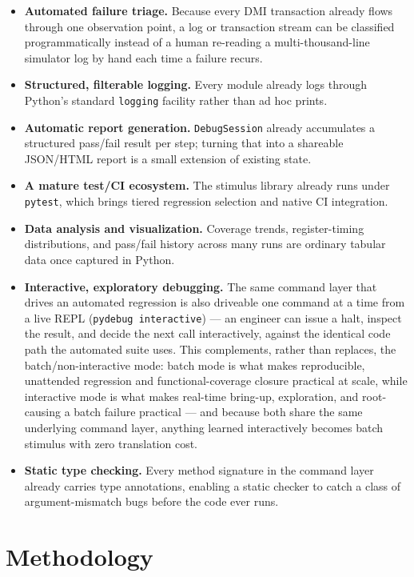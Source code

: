 \documentclass[conference]{IEEEtran}
\begin{document}
\begin{itemize}
\item \textbf{Automated failure triage.} Because every DMI transaction already flows through one observation point, a log or transaction stream can be classified programmatically instead of a human re-reading a multi-thousand-line simulator log by hand each time a failure recurs.
\item \textbf{Structured, filterable logging.} Every module already logs through Python's standard \texttt{logging} facility rather than ad hoc prints.
\item \textbf{Automatic report generation.} \texttt{DebugSession} already accumulates a structured pass/fail result per step; turning that into a shareable JSON/HTML report is a small extension of existing state.
\item \textbf{A mature test/CI ecosystem.} The stimulus library already runs under \texttt{pytest}, which brings tiered regression selection and native CI integration.
\item \textbf{Data analysis and visualization.} Coverage trends, register-timing distributions, and pass/fail history across many runs are ordinary tabular data once captured in Python.
\item \textbf{Interactive, exploratory debugging.} The same command layer that drives an automated regression is also driveable one command at a time from a live REPL (\texttt{pydebug interactive}) --- an engineer can issue a halt, inspect the result, and decide the next call interactively, against the identical code path the automated suite uses. This complements, rather than replaces, the batch/non-interactive mode: batch mode is what makes reproducible, unattended regression and functional-coverage closure practical at scale, while interactive mode is what makes real-time bring-up, exploration, and root-causing a batch failure practical --- and because both share the same underlying command layer, anything learned interactively becomes batch stimulus with zero translation cost.
\item \textbf{Static type checking.} Every method signature in the command layer already carries type annotations, enabling a static checker to catch a class of argument-mismatch bugs before the code ever runs.
\end{itemize}

\section{Methodology}
\label{sec:methodology}
\end{document}
